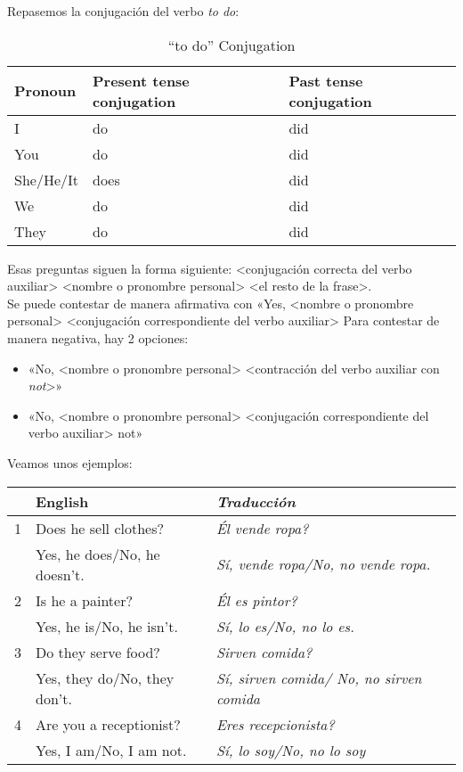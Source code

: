 Repasemos la conjugaci\'on del verbo \emph{to do}:

\begin{table}[H]
	\centering
	\begin{tabular}{lll}
	\toprule
		\textbf{Pronoun} & \textbf{Present tense conjugation} & \textbf{Past tense conjugation}\\
	\midrule
		I & do & did\\
		You & do & did\\
		She/He/It & does & did \\
		We & do & did\\
		They & do & did\\
	\bottomrule
	\end{tabular}
	\caption{``to do'' Conjugation}
\end{table}

Esas preguntas siguen la forma siguiente:
<conjugaci\'on correcta del verbo auxiliar> <nombre o pronombre personal> <el resto de la frase>. \\

Se puede contestar de manera afirmativa con
«Yes, <nombre o pronombre personal> <conjugación correspondiente del verbo auxiliar>
Para contestar de manera negativa, hay 2 opciones:
\begin{itemize}
	\item «No, <nombre o pronombre personal> <contracción del verbo auxiliar con \emph{not}>»
	\item «No, <nombre o pronombre personal> <conjugación correspondiente del verbo auxiliar> not»
\end{itemize}

Veamos unos ejemplos:



\begin{table}[H]
	\centering
	\begin{tabular}{lp{7cm}p{8cm}}
		\toprule
			& \textbf{English} & \textbf{\emph{Traducci\'on}} \\
		\midrule
			1 & Does he sell clothes? & \emph{\textquestiondown Él vende ropa?} \\
				& Yes, he does/No, he doesn't. & \emph{Sí, vende ropa/No, no vende ropa.} \\
			2 & Is he a painter? & \emph{\textquestiondown Él es pintor?} \\
				& Yes, he is/No, he isn't. & \emph{Sí, lo es/No, no lo es.} \\
			3 & Do they serve food? & \emph{\textquestiondown Sirven comida?} \\
				& Yes, they do/No, they don't. & \emph{Sí, sirven comida/ No, no sirven comida} \\
			4 & Are you a receptionist? & \emph{\textquestiondown Eres recepcionista?} \\
				& Yes, I am/No, I am not. & \emph{Sí, lo soy/No, no lo soy} \\
		\bottomrule
	\end{tabular}
\end{table}

